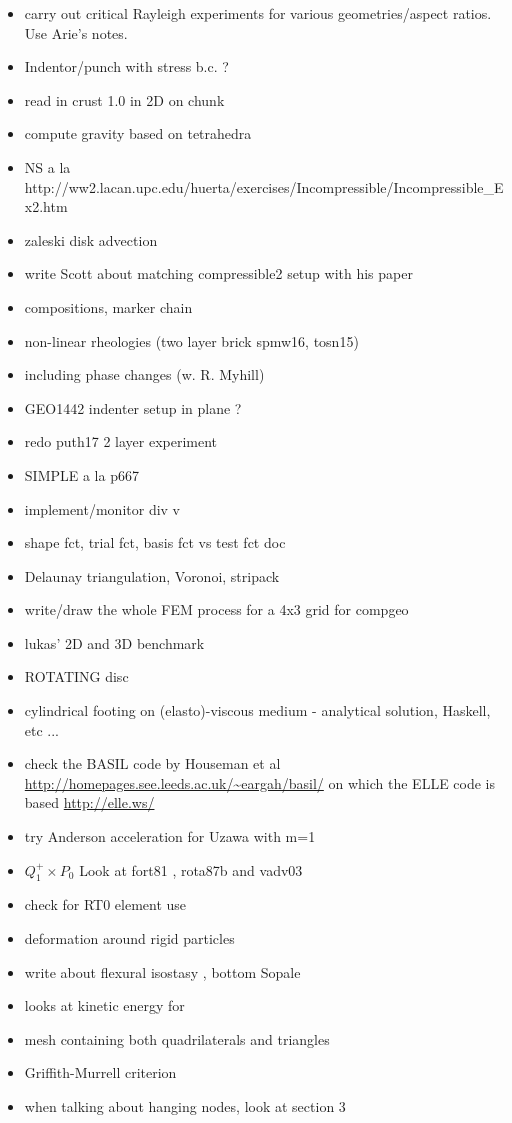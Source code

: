 \begin{itemize}
\item carry out critical Rayleigh experiments for various geometries/aspect ratios. Use Arie's notes. 
\item Indentor/punch with stress b.c. ?
\item read in crust 1.0 in 2D on chunk
\item compute gravity based on tetrahedra
\item NS a la http://ww2.lacan.upc.edu/huerta/exercises/Incompressible/Incompressible\_Ex2.htm
\item zaleski disk advection
\item write Scott about matching compressible2 setup with his paper
\item compositions, marker chain
\item non-linear rheologies (two layer brick spmw16, tosn15) 
\item including phase changes (w. R. Myhill)
\item GEO1442 indenter setup in plane ?
\item redo puth17 2 layer experiment
\item SIMPLE a la p667 \cite{john16} 
\item implement/monitor div v
\item shape fct, trial fct, basis fct vs test fct doc
\item Delaunay triangulation, Voronoi, stripack
\item write/draw the whole FEM process for a 4x3 grid for compgeo
\item lukas' 2D and 3D benchmark
\item ROTATING disc
\item cylindrical footing on (elasto)-viscous medium - analytical solution, Haskell, etc ...
\item check the BASIL code by Houseman et al \url{http://homepages.see.leeds.ac.uk/~eargah/basil/}
on which the ELLE code is based \url{http://elle.ws/} 
\item try Anderson acceleration for Uzawa \cite{hoow17} with m=1
\item $Q_1^+ \times P_0$ Look at fort81 , rota87b and vadv03
\item check \cite{bufm19} for RT0 element use
\item deformation around rigid particles \cite{ilma93}
\item write about flexural isostasy \cite{maie12}, bottom Sopale
\item \cite{maie12} looks at kinetic energy for \cite{trab90} 
\item mesh containing both quadrilaterals and triangles \cite{anbr80}
\item Griffith-Murrell criterion \cite{brau94}
\item when talking about hanging nodes, look at \cite{bugs09} section 3
\end{itemize}


